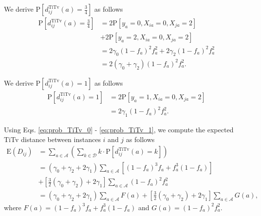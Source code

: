 \documentclass[10pt,letterpaper]{article}\usepackage[]{graphicx}\usepackage[]{color}
\begin{document}
We derive $\text{P}\left[d^\text{TiTv}_{ij}(a) = \frac{3}{4}\right]$ as follows
%
\begin{equation}\label{eq:prob_TiTv_0.75}
\begin{aligned}
\text{P}\left[d^\text{TiTv}_{ij}(a) = \frac{3}{4}\right] &= 2 \text{P}\left[y_a = 0, X_{ia} = 0, X_{ja} = 2\right] \\
&+ 2 \text{P}\left[y_a = 2, X_{ia} = 0, X_{ja} = 2\right] \\
&= 2 \gamma_0 (1 - f_a)^2 f^2_a + 2 \gamma_2 (1 - f_a)^2 f^2_a \\
&= 2(\gamma_0 + \gamma_2)(1 - f_a)^2 f^2_a.
\end{aligned}
\end{equation}

We derive $\text{P}\left[d^\text{TiTv}_{ij}(a) = 1\right]$ as follows
%
\begin{equation}\label{eq:prob_TiTv_1}
\begin{aligned}
\text{P}\left[d^\text{TiTv}_{ij}(a) = 1\right] &= 2 \text{P}\left[y_a = 1, X_{ia} = 0, X_{ja} = 2\right] \\
&= 2 \gamma_1 (1 - f_a)^2 f^2_a.
\end{aligned}
\end{equation}

Using Eqs. \ref{eq:prob_TiTv_0} - \ref{eq:prob_TiTv_1}, we compute the expected TiTv distance between instances $i$ and $j$ as follows
%
\begin{equation}\label{eq:mu_DDistr_TiTv}
\begin{aligned}
\text{E}(D_{ij}) &= \sum_{a \in \mathcal{A}} \left(\sum_{k \in \mathcal{D}} k \cdot \text{P}\left[d^\text{TiTv}_{ij}(a) = k\right]\right) \\
&= (\gamma_0 + \gamma_2 + 2\gamma_1) \sum_{a \in \mathcal{A}} \left[(1 - f_a)^3 f_a + f^3_a (1 - f_a)\right] \\
&+ \left[\frac{3}{2}(\gamma_0 + \gamma_2) + 2\gamma_1\right] \sum_{a \in \mathcal{A}} (1 - f_a)^2 f^2_a \\
&= (\gamma_0 + \gamma_2 + 2\gamma_1) \sum_{a \in \mathcal{A}} F(a) + \left[\frac{3}{2}(\gamma_0 + \gamma_2) + 2\gamma_1\right] \sum_{a \in \mathcal{A}} G(a),
\end{aligned}
\end{equation}
where $F(a) = (1 - f_a)^3 f_a + f^3_a (1 - f_a)$ and $G(a) = (1 - f_a)^2 f^2_a$.
\end{document}
